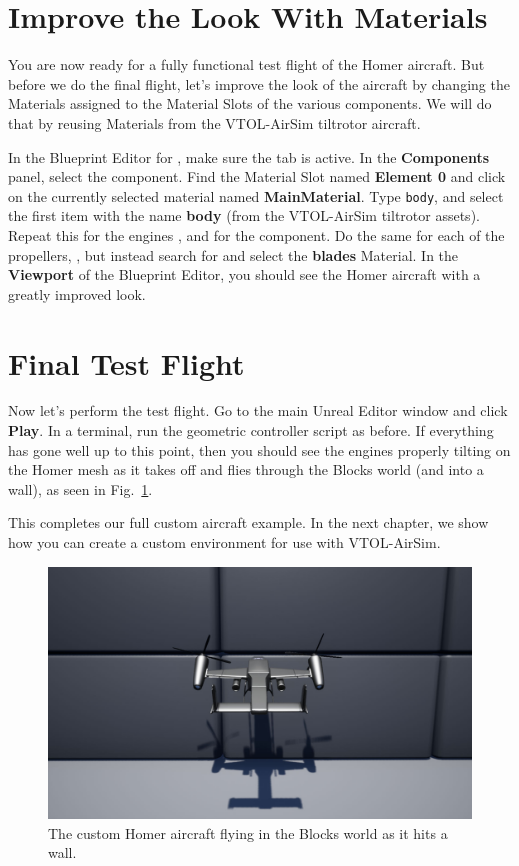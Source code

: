 \section{Improve the Look With Materials}
You are now ready for a fully functional test flight of the Homer aircraft. But before we do the final flight, let's improve the look of the aircraft by changing the Materials assigned to the Material Slots of the various components. We will do that by reusing Materials from the VTOL-AirSim tiltrotor aircraft.

In the Blueprint Editor for , make sure the  tab is active. In the \textbf{Components} panel, select the  component. Find the Material Slot named \textbf{Element 0} and click on the currently selected material named \textbf{MainMaterial}. Type \texttt{body}, and select the first item with the name \textbf{body} (from the VTOL-AirSim tiltrotor assets). Repeat this for the engines , and for the  component. Do the same for each of the propellers, , but instead search for and select the \textbf{blades} Material. In the \textbf{Viewport} of the Blueprint Editor, you should see the Homer aircraft with a greatly improved look.

\section{Final Test Flight}
Now let's perform the test flight. Go to the main Unreal Editor window and click \textbf{Play}. In a terminal, run the geometric controller script as before. If everything has gone well up to this point, then you should see the engines properly tilting on the Homer mesh as it takes off and flies through the Blocks world (and into a wall), as seen in Fig.~\ref{fig:homerpawn_flight}.

This completes our full custom aircraft example. In the next chapter, we show how you can create a custom environment for use with VTOL-AirSim.

\begin{figure}[h]
    \centering
    \includegraphics[width=\textwidth]{figures/homerpawn_final_flight}
    \caption[Custom aircraft flying in VTOL-AirSim]{
        The custom Homer aircraft flying in the Blocks world as it hits a wall.}%
    \label{fig:homerpawn_flight}
\end{figure}